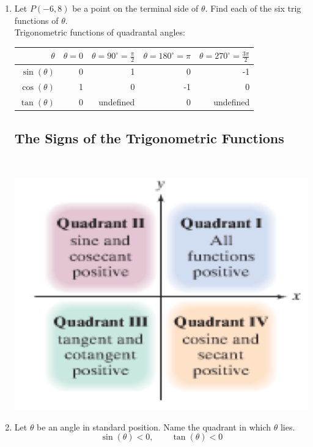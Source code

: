 \begin{enumerate}
\item Let $P(-6,8)$ be a point on the terminal side of $\theta$.  Find each of the six trig functions of $\theta$.\\[2in]

\noindent
Trigonometric functions of quadrantal angles:\\
\begin{tabular}{|r|r|r|r|r|} \hline
  $\theta$ & $\theta=0$ & $\theta=90^\circ=\frac{\pi}{2}$ & $\theta=180^\circ=\pi$ & $\theta=270^\circ=\frac{3\pi}{2}$\\ \hline
  $\sin(\theta)$ & 0 & 1 &  0 & -1 \\ \hline
  $\cos(\theta)$ & 1 & 0 & -1 & 0  \\ \hline
  $\tan(\theta)$ & 0 & undefined & 0 & undefined \\ \hline
\end{tabular}

\subsection{The Signs of the Trigonometric Functions} ~

\begin{center}
\includegraphics[scale=.8]{signs}
\end{center}

\item Let $\theta$ be an angle in standard position.  Name the quadrant in which $\theta$ lies.
$$\sin(\theta)<0, \quad \quad \tan(\theta)<0$$



\end{enumerate}
